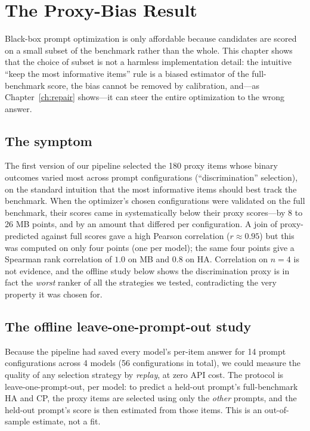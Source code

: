 \chapter{The Proxy-Bias Result}
\label{ch:proxybias}

Black-box prompt optimization is only affordable because candidates are scored on a small
subset of the benchmark rather than the whole. This chapter shows that the choice of subset
is not a harmless implementation detail: the intuitive ``keep the most informative items''
rule is a biased estimator of the full-benchmark score, the bias cannot be removed by
calibration, and---as Chapter~\ref{ch:repair} shows---it can steer the entire optimization
to the wrong answer.

\section{The symptom}

The first version of our pipeline selected the 180 proxy items whose binary outcomes varied
most across prompt configurations (``discrimination'' selection), on the standard intuition
that the most informative items should best track the benchmark. When the optimizer's chosen
configurations were validated on the full benchmark, their scores came in systematically
below their proxy scores---by 8 to 26 MB points, and by an amount that differed per
configuration. A join of proxy-predicted against full scores gave a high Pearson correlation
($r \approx 0.95$) but this was computed on only four points (one per model); the same four
points give a Spearman rank correlation of $1.0$ on MB and $0.8$ on HA. Correlation on
$n=4$ is not evidence, and the offline study below shows the discrimination proxy is in fact
the \emph{worst} ranker of all the strategies we tested, contradicting the very property it
was chosen for.

\section{The offline leave-one-prompt-out study}

Because the pipeline had saved every model's per-item answer for 14 prompt configurations
across 4 models (56 configurations in total), we could measure the quality of any selection
strategy by \emph{replay}, at zero API cost. The protocol is leave-one-prompt-out, per
model: to predict a held-out prompt's full-benchmark HA and CP, the proxy items are selected
using only the \emph{other} prompts, and the held-out prompt's score is then estimated from
those items. This is an out-of-sample estimate, not a fit.

